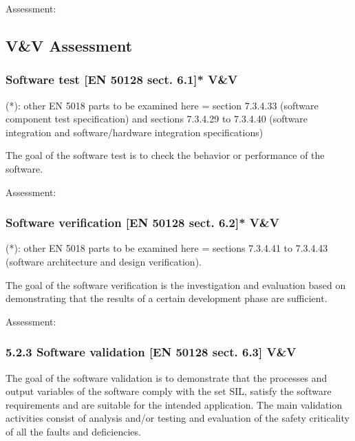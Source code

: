 \bigskip

Assessment:


\bigskip

\subsection{V\&V Assessment}

\bigskip

\subsubsection{Software test [EN 50128 sect. 6.1]* V\&V}
(*): other EN 5018 parts to be examined here = section 7.3.4.33 (software component test specification) and sections
7.3.4.29 to 7.3.4.40 (software integration and software/hardware integration specifications)

The goal of the software test is to check the behavior or performance of the software.


\bigskip

Assessment:

\subsubsection{Software verification [EN 50128 sect.
6.2]* V\&V}
(*): other EN 5018 parts to be examined here = sections 7.3.4.41 to 7.3.4.43 (software architecture and design
verification).


\bigskip

The goal of the software verification is the investigation and evaluation based on demonstrating that the results of a
certain development phase are sufficient.

Assessment:


\bigskip

\subsubsection[5.2.3 Software validation [EN 50128 sect. 6.3{]} V\&V]{5.2.3 Software validation [EN 50128 sect. 6.3]
V\&V}
The goal of the software validation is to demonstrate that the processes and output variables of the software comply
with the set SIL, satisfy the software requirements and are suitable for the intended application. The main validation
activities consist of analysis and/or testing and evaluation of the safety criticality of all the faults and
deficiencies.


\bigskip

